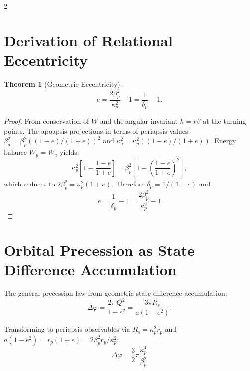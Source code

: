 \documentclass[10pt, a4paper]{article}
\newtheorem{theorem}{Theorem}[section]
\begin{document}
\begin{multicols}{2}
\section{Derivation of Relational Eccentricity}
\hypertarget{sec:rel_ecc}{}\label{sec:rel_ecc}

\begin{theorem}[Geometric Eccentricity]
\begin{equation}
e = \frac{2\beta_p^2}{\kappa_p^2}-1=\frac{1}{\delta_p} - 1.
\end{equation}
\end{theorem}

\begin{proof}
From conservation of $W$ and the angular invariant $h = r\beta$ at the turning points. The apoapsis projections in terms of periapsis values: $\beta_a^2 = \beta_p^2((1-e)/(1+e))^2$ and $\kappa_a^2 = \kappa_p^2((1-e)/(1+e))$. Energy balance $W_p = W_a$ yields:
\[
\kappa_p^2[1 - \frac{1-e}{1+e}] = \beta_p^2[1 - (\frac{1-e}{1+e})^2],
\]
which reduces to $2\beta_p^2 = \kappa_p^2(1+e)$.
\hypertarget{eq:proj-balance}{}\label{eq:proj-balance}
Therefore $\delta_p = 1/(1+e)$ and
\[
\boxed{e = \frac{1}{\delta_p} - 1 = \frac{2\beta_p^2}{\kappa_p^2}-1}
\]
\end{proof}



\section{Orbital Precession as State Difference Accumulation}
\hypertarget{sec:precession_law}{}\label{sec:precession_law}

The general precession law from geometric state difference accumulation:
\hypertarget{eq:precession_law}{}\label{eq:precession_law}
\begin{equation}
\Delta\varphi = \frac{2\pi\,Q^{2}}{1-e^{2}} = \frac{3\pi R_s}{a(1-e^2)}.
\end{equation}

Transforming to periapsis observables via $R_s = \kappa_p^2 r_p$ and $a(1-e^2) = r_p(1+e) = 2\beta_p^2 r_p/\kappa_p^2$:
\hypertarget{eq:light-ratio-law}{}\label{eq:light-ratio-law}
\begin{equation}
\boxed{\Delta\varphi = \frac{3}{2}\pi \frac{\kappa_p^4}{\beta_p^2}}
\end{equation}


\end{multicols}
\end{document}

